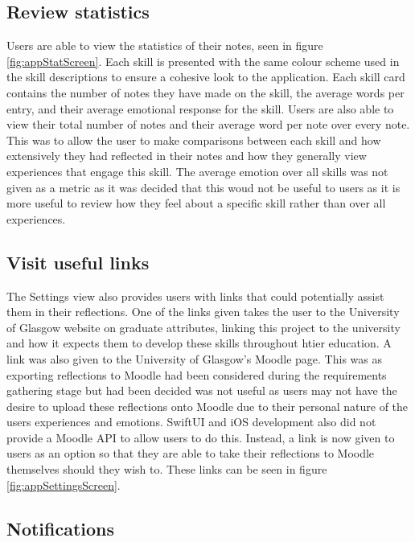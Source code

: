 \documentclass{l4proj}
\begin{document}
\subsection{Review statistics}

Users are able to view the statistics of their notes, seen in figure \ref{fig:appStatScreen}. Each skill is presented with the same colour scheme used in the skill descriptions to ensure a cohesive look to the application. Each skill card contains the number of notes they have made on the skill, the average words per entry, and their average emotional response for the skill. Users are also able to view their total number of notes and their average word per note over every note. This was to allow the user to make comparisons between each skill and how extensively they had reflected in their notes and how they generally view experiences that engage this skill. The average emotion over all skills was not given as a metric as it was decided that this woud not be useful to users as it is more useful to review how they feel about a specific skill rather than over all experiences. 

\subsection{Visit useful links}

The Settings view also provides users with links that could potentially assist them in their reflections. One of the links given takes the user to the University of Glasgow website on graduate attributes, linking this project to the university and how it expects them to develop these skills throughout htier education. A link was also given to the University of Glasgow's Moodle page. This was as exporting reflections to Moodle had been considered during the requirements gathering stage but had been decided was not useful as users may not have the desire to upload these reflections onto Moodle due to their personal nature of the users experiences and emotions. SwiftUI and iOS development also did not provide a Moodle API to allow users to do this. Instead, a link is now given to users as an option so that they are able to take their reflections to Moodle themselves should they wish to. These links can be seen in figure \ref{fig:appSettingsScreen}.

\subsection{Notifications}
\end{document}
